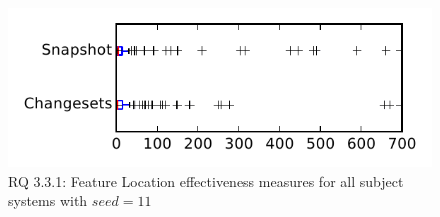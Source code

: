 
\begin{figure}
\centering
\includegraphics[height=0.4\textheight]{figures/flt_seed/rq1_tiny_11}
\caption{RQ 3.3.1: Feature Location effectiveness measures for all subject systems with $seed=11$}
\label{fig:flt_seed:rq1:tiny}
\end{figure}
